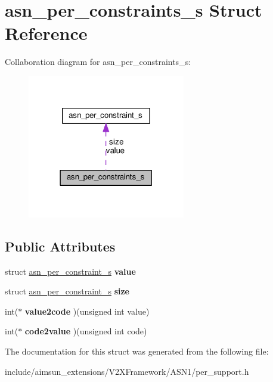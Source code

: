 \hypertarget{structasn__per__constraints__s}{}\section{asn\+\_\+per\+\_\+constraints\+\_\+s Struct Reference}
\label{structasn__per__constraints__s}


Collaboration diagram for asn\+\_\+per\+\_\+constraints\+\_\+s\+:\nopagebreak
\begin{figure}[H]
\begin{center}
\leavevmode
\includegraphics[width=195pt]{structasn__per__constraints__s__coll__graph}
\end{center}
\end{figure}
\subsection*{Public Attributes}
\begin{DoxyCompactItemize}
\item 
struct \hyperlink{structasn__per__constraint__s}{asn\+\_\+per\+\_\+constraint\+\_\+s} {\bfseries value}\hypertarget{structasn__per__constraints__s_a2f4880909e4252c4dc02fda137333ac1}{}\label{structasn__per__constraints__s_a2f4880909e4252c4dc02fda137333ac1}

\item 
struct \hyperlink{structasn__per__constraint__s}{asn\+\_\+per\+\_\+constraint\+\_\+s} {\bfseries size}\hypertarget{structasn__per__constraints__s_aa2c238bac937d10909e541f68a3e773a}{}\label{structasn__per__constraints__s_aa2c238bac937d10909e541f68a3e773a}

\item 
int($\ast$ {\bfseries value2code} )(unsigned int value)\hypertarget{structasn__per__constraints__s_a6cd114154e4dcc184aba1d3537d8d69a}{}\label{structasn__per__constraints__s_a6cd114154e4dcc184aba1d3537d8d69a}

\item 
int($\ast$ {\bfseries code2value} )(unsigned int code)\hypertarget{structasn__per__constraints__s_a7fddc594fa083be79a1ff001879f9cd9}{}\label{structasn__per__constraints__s_a7fddc594fa083be79a1ff001879f9cd9}

\end{DoxyCompactItemize}


The documentation for this struct was generated from the following file\+:\begin{DoxyCompactItemize}
\item 
include/aimsun\+\_\+extensions/\+V2\+X\+Framework/\+A\+S\+N1/per\+\_\+support.\+h\end{DoxyCompactItemize}
